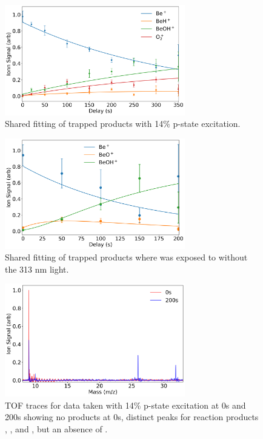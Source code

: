 
\begin{figure}[H]
	\centering
	\includegraphics[width=0.7\textwidth]{images/Be_O2_laser_fit.png}
	\caption{\label{fig: laser fit} Shared fitting of trapped products with 14\% p-state excitation.}
\end{figure}

\begin{figure}[H]
	\centering
	\includegraphics[width=0.7\textwidth]{images/Be_O2_no_laser_fit.png}
	\caption{\label{fig: no laser fit} Shared fitting of trapped products where  was exposed to  without the 313 nm light.}
\end{figure}

\begin{figure}[H]
	\centering
	\includegraphics[width=0.7\textwidth]{images/Be_O2_laser_TOF.png}
	\caption{TOF traces for data taken with 14\% p-state excitation at 0s and 200s showing no products at 0s, distinct peaks for reaction products , , and , but an absence of .}
	\label{fig: laser TOF}
\end{figure}

